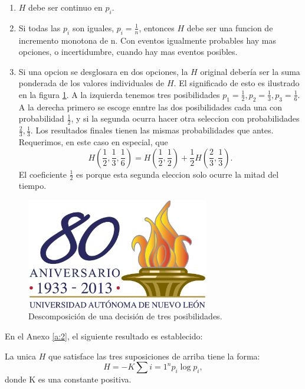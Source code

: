 \begin{enumerate}
\item{$H$ debe ser continuo en $p_{i}$.}
\item{Si todas las $p_{i}$ son iguales, $p_{i} = \frac{1}{n}$, entonces $H$ debe ser una funcion de incremento monotona de n. Con eventos igualmente probables hay mas opciones, o incertidumbre, cuando hay mas eventos posibles.}
\item{Si una opcion se desglosara en dos opciones, la $H$ original
  deber\'{i}a ser la suma ponderada de los valores individuales de
  $H$. El significado de esto es ilustrado en la figura \ref{fig:6}. A
  la izquierda tenemos tres posibilidades $p_{1} = \frac{1}{2}, p_{2}
  = \frac{1}{3}, p_{3} = \frac{1}{6}$. A la derecha primero se escoge
  enntre las dos posibilidades cada una con probabilidad
  $\frac{1}{2}$, y si la segunda ocurra hacer otra seleccion con
  probabilidades $\frac{2}{3}, \frac{1}{3}$. Los resultados finales
  tienen las mismas probabilidades que antes. Requerimos, en este caso
  en especial, que
\begin{equation}
H(\frac{1}{2},\frac{1}{3},\frac{1}{6}) = H(\frac{1}{2},\frac{1}{2}) +
\frac{1}{2}H(\frac{2}{3},\frac{1}{3}).
\end{equation}
El coeficiente $\frac{1}{2}$ es porque esta segunda eleccion solo ocurre la mitad del tiempo.}
\end{enumerate}

\begin{figure}[!ht]
\centerline{\includegraphics[width=80mm]{ejemplo.png}}
\caption{Descomposici\'{o}n de una decisi\'{o}n de tres posibilidades.}
\label{fig:6}
\end{figure}

En el Anexo \ref{a:2}, el siguiente resultado es establecido:

\begin{theorem}
La unica $H$ que satisface las tres suposiciones de arriba tiene la
forma:
\begin{equation}
H = -K \sum{i=1}^{n} p_{i} \log p_{i},
\end{equation}
donde K es una constante positiva.
\label{th:2}
\end{theorem}

